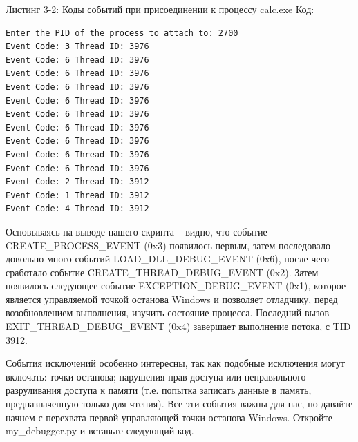 \documentclass[12pt]{book}
\begin{document}
Листинг 3-2: Коды событий при присоединении к процессу calc.exe
Код:
\begin{lstlisting}
Enter the PID of the process to attach to: 2700
Event Code: 3 Thread ID: 3976
Event Code: 6 Thread ID: 3976
Event Code: 6 Thread ID: 3976
Event Code: 6 Thread ID: 3976
Event Code: 6 Thread ID: 3976
Event Code: 6 Thread ID: 3976
Event Code: 6 Thread ID: 3976
Event Code: 6 Thread ID: 3976
Event Code: 6 Thread ID: 3976
Event Code: 6 Thread ID: 3976
Event Code: 2 Thread ID: 3912
Event Code: 1 Thread ID: 3912
Event Code: 4 Thread ID: 3912
\end{lstlisting}

Основываясь на выводе нашего скрипта – видно, что событие CREATE\_PROCESS\_EVENT (0x3) появилось первым, затем последовало довольно много событий LOAD\_DLL\_DEBUG\_EVENT (0x6), после чего сработало событие CREATE\_THREAD\_DEBUG\_EVENT (0x2). Затем появилось следующее событие EXCEPTION\_DEBUG\_EVENT (0x1), которое является управляемой точкой останова Windows и позволяет отладчику, перед возобновлением выполнения, изучить состояние процесса. Последний вызов EXIT\_THREAD\_DEBUG\_EVENT (0x4) завершает выполнение потока, с TID 3912.

События исключений особенно интересны, так как подобные исключения могут включать: точки останова; нарушения прав доступа или неправильного разруливания доступа к памяти (т.е. попытка записать данные в память, предназначенную только для чтения). Все эти события важны для нас, но давайте начнем с перехвата первой управляющей точки останова Windows. Откройте my\_debugger.py и вставьте следующий код.
\end{document}
